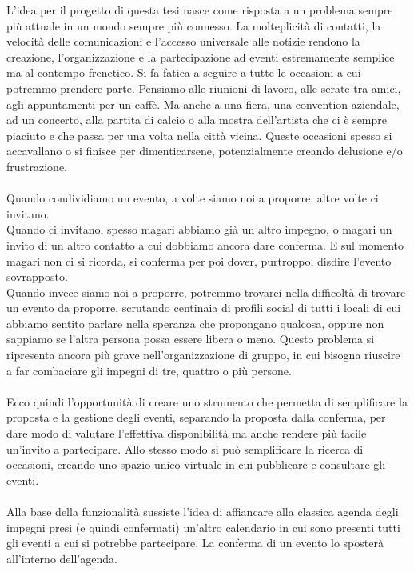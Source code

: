 L'idea per il progetto di questa tesi nasce come risposta a un problema sempre più attuale in un mondo sempre più connesso.
La molteplicità di contatti, la velocità delle comunicazioni e l'accesso universale alle notizie 
rendono la creazione, l'organizzazione e la partecipazione ad eventi estremamente semplice ma al contempo frenetico.
Si fa fatica a seguire a tutte le occasioni a cui potremmo prendere parte.
Pensiamo alle riunioni di lavoro, alle serate tra amici, agli appuntamenti per un caffè.
Ma anche a una fiera, una convention aziendale, ad un concerto, alla partita di calcio o alla mostra dell'artista che ci è sempre piaciuto e che passa per una volta nella città vicina.
Queste occasioni spesso si accavallano o si finisce per dimenticarsene, potenzialmente creando delusione e/o frustrazione.\\
\\
Quando condividiamo un evento, a volte siamo noi a proporre, altre volte ci invitano. \\
Quando ci invitano, spesso magari abbiamo già un altro impegno, o magari un invito di un altro contatto a cui dobbiamo ancora dare conferma. 
E sul momento magari non ci si ricorda, si conferma per poi dover, purtroppo, disdire l'evento sovrapposto.\\
Quando invece siamo noi a proporre, potremmo trovarci nella difficoltà di trovare un evento da proporre, 
scrutando centinaia di profili social di tutti i locali di cui abbiamo sentito parlare nella speranza che propongano qualcosa, 
oppure non sappiamo se l'altra persona possa essere libera o meno. 
Questo problema si ripresenta ancora più grave nell'organizzazione di gruppo, in cui bisogna riuscire a far combaciare gli impegni di tre, quattro o più persone.\\
\\
Ecco quindi l'opportunità di creare uno strumento che permetta di semplificare la proposta e la gestione degli eventi, 
separando la proposta dalla conferma, per dare modo di valutare l'effettiva disponibilità ma anche rendere più facile un'invito a partecipare.
Allo stesso modo si può semplificare la ricerca di occasioni, creando uno spazio unico virtuale in cui pubblicare e consultare gli eventi.\\
\\
Alla base della funzionalità sussiste l'idea di affiancare alla classica agenda degli impegni presi (e quindi confermati) 
un'altro calendario in cui sono presenti tutti gli eventi a cui si potrebbe partecipare. 
La conferma di un evento lo sposterà all'interno dell'agenda.\\

